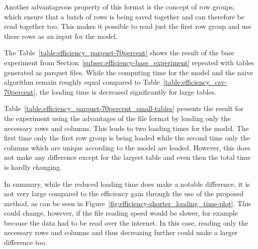 Another advantageous property of this format is the concept of row groups, which ensure that a batch of rows is being saved together and can therefore be read together too. This makes it possible to read just the first row group and use these rows as an input for the model.

The Table~\ref{table:efficiency_parquet-70percent} shows the result of the base experiment from Section~\ref{subsec:efficiency-base_experiment} repeated with tables generated as parquet files. While the computing time for the model and the naive algorithm remain roughly equal compared to Table~\ref{table:efficiency_csv-70percent}, the loading time is decreased significantly for large tables. %

Table~\ref{table:efficiency_parquet-70percent_small-tables} presents the result for the experiment using the advantages of the file format by loading only the necessary rows and columns. This leads to two loading times for the model. The first time only the first row group is being loaded while the second time only the columns which are unique according to the model are loaded. However, this does not make any difference except for the largest table and even then the total time is hardly changing.

In summary, while the reduced loading time does make a notable difference, it is not very large compared to the efficiency gain through the use of the proposed method, as can be seen in Figure~\ref{fig:efficiency-shorter_loading_time-plot}. This could change, however, if the file reading speed would be slower, for example because the data had to be read over the internet. In this case, reading only the necessary rows and columns and thus decreasing \io{} further could make a larger difference too.









